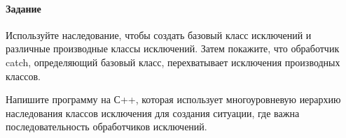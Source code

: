 \paragraph{Задание}

Используйте наследование, чтобы создать базовый класс исключений и различные производные классы исключений.
Затем покажите, что обработчик catch, определяющий базовый класс, перехватывает исключения производных классов.

Напишите программу на С++, которая использует многоуровневую иерархию наследования классов исключения для создания ситуации, где важна последовательность обработчиков исключений.



